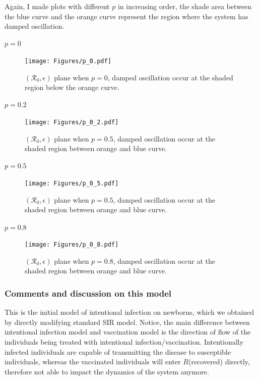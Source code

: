 \documentclass[12pt]{article}
\newcommand{\R}{\mathcal{R}}
\begin{document}
Again, I made plots with different $p$ in increasing order, the shade area between the blue curve and the orange curve represent the region where the system has damped oscillation.
\paragraph{$p=0$}
\begin{figure}[H]
  \centering
  \texttt{[image: Figures/p\_0.pdf]}
  \caption{$(\R_0,\epsilon)$ plane when $p=0$, damped oscillation occur at the shaded region below the orange curve.}
\end{figure}

\paragraph{$p=0.2$}
\begin{figure}[H]
  \centering
  \texttt{[image: Figures/p\_0\_2.pdf]}
  \caption{$(\R_0,\epsilon)$ plane when $p=0.5$, damped oscillation occur at the shaded region between orange and blue curve.}
\end{figure}

\paragraph{$p=0.5$}
\begin{figure}[H]
  \centering
  \texttt{[image: Figures/p\_0\_5.pdf]}
  \caption{$(\R_0,\epsilon)$ plane when $p=0.5$, damped oscillation occur at the shaded region between orange and blue curve.}
\end{figure}

\paragraph{$p=0.8$}
\begin{figure}[H]
  \centering
  \texttt{[image: Figures/p\_0\_8.pdf]}
  \caption{$(\R_0,\epsilon)$ plane when $p=0.8$, damped oscillation occur at the shaded region between orange and blue curve.}
\end{figure}
\clearpage

\subsubsection{Comments and discussion on this model}
This is the initial model of intentional infection on newborns, which we obtained by directly modifying standard SIR model. Notice, the main difference between intentional infection model and vaccination model is the direction of flow of the individuals being treated with intentional infection/vaccination. Intentionally infected individuals are capable of transmitting the disease to susceptible individuals, whereas the vaccinated individuals will enter $R$(recovered) directly, therefore not able to impact the dynamics of the system anymore. 
\end{document}
